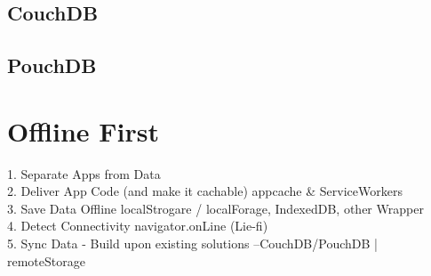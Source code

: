 \subsection{CouchDB}
\subsection{PouchDB}

%
%
\section{Offline First}
1. Separate Apps from Data\\
2. Deliver App Code (and make it cachable) {appcache \& ServiceWorkers}\\
3. Save Data Offline {localStrogare / localForage, IndexedDB, other Wrapper}\\
4. Detect Connectivity {navigator.onLine} (Lie-fi)\\
5. Sync Data - Build upon existing solutions --CouchDB/PouchDB | remoteStorage\\